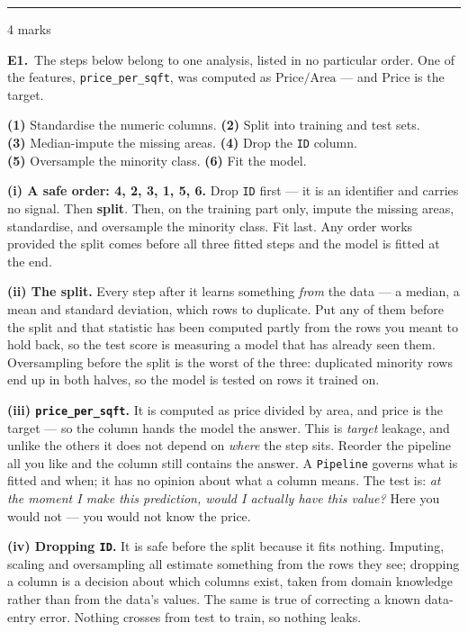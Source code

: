 \documentclass[10pt,a4paper]{article}
\newcommand{\parthead}[2]{\vspace{2pt}\noindent\rule{\linewidth}{0.4pt}\par\vspace{2pt}%
  \noindent{\bfseries Part #1}\hfill{\small #2}\par\vspace{1pt}}
\begin{document}
\newpage

\parthead{E --- Reasoning}{4 marks}

\textbf{E1.}\ The steps below belong to one analysis, listed in no particular order. One of the features,
\texttt{price\_per\_sqft}, was computed as $\text{Price}/\text{Area}$ --- and $\text{Price}$ is the target.

\vspace{2mm}
\hspace*{4mm}\textbf{(1)} Standardise the numeric columns. \quad \textbf{(2)} Split into training and test sets.\\
\hspace*{4mm}\textbf{(3)} Median-impute the missing areas. \quad \textbf{(4)} Drop the \texttt{ID} column.\\
\hspace*{4mm}\textbf{(5)} Oversample the minority class. \quad \textbf{(6)} Fit the model.

\vspace{4pt}

\textbf{(i) A safe order: 4, 2, 3, 1, 5, 6.} Drop \texttt{ID} first --- it is an identifier and carries no signal. Then \textbf{split}. Then, on the training part only, impute the missing areas, standardise, and oversample the minority class. Fit last. Any order works provided the split comes before all three fitted steps and the model is fitted at the end.\par\vspace{1mm}\textbf{(ii) The split.} Every step after it learns something \emph{from} the data --- a median, a mean and standard deviation, which rows to duplicate. Put any of them before the split and that statistic has been computed partly from the rows you meant to hold back, so the test score is measuring a model that has already seen them. Oversampling before the split is the worst of the three: duplicated minority rows end up in both halves, so the model is tested on rows it trained on.\par\vspace{1mm}\textbf{(iii) \texttt{price\_per\_sqft}.} It is computed as price divided by area, and price is the target --- so the column hands the model the answer. This is \emph{target} leakage, and unlike the others it does not depend on \emph{where} the step sits. Reorder the pipeline all you like and the column still contains the answer. A \texttt{Pipeline} governs what is fitted and when; it has no opinion about what a column means. The test is: \emph{at the moment I make this prediction, would I actually have this value?} Here you would not --- you would not know the price.\par\vspace{1mm}\textbf{(iv) Dropping \texttt{ID}.} It is safe before the split because it fits nothing. Imputing, scaling and oversampling all estimate something from the rows they see; dropping a column is a decision about which columns exist, taken from domain knowledge rather than from the data's values. The same is true of correcting a known data-entry error. Nothing crosses from test to train, so nothing leaks.
\end{document}
